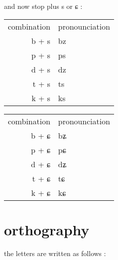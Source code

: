 \documentclass{article}
\begin{document}
and now stop plus s or ɕ :

\begin{tabular}{r|l}
combination & pronounciation\\
b + s & bz\\
p + s & ps\\
d + s & dz\\
t + s & ts\\
k + s & ks\\
\end{tabular}
\begin{tabular}{r|l}
combination & pronounciation\\
b + ɕ & bʑ\\
p + ɕ & pɕ\\
d + ɕ & dʑ\\
t + ɕ & tɕ\\
k + ɕ & kɕ\\
\end{tabular}


\section{orthography}
the letters are written as follows :
\end{document}
